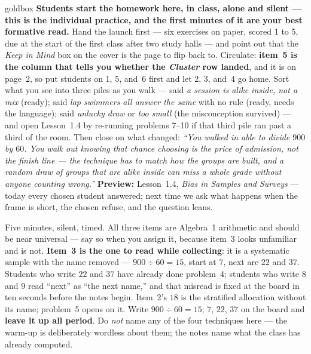 \documentclass[10pt]{article}
\begin{document}
\boxguard
\begin{skillbox}{goldbox}
\textbf{Students start the homework here, in class, alone and silent --- this is the individual
practice, and the first minutes of it are your best formative read.} Hand the launch first ---
six exercises on paper, scored 1 to 5, due at the start of the first class after two study
halls --- and point out that the \emph{Keep in Mind} box on the cover is the page to flip back
to. Circulate: \textbf{item~5 is the column that tells you whether the \emph{Cluster} row
landed}, and it is
on page~2, so put students on 1, 5, and~6 first and let 2, 3, and~4 go home. Sort what you see
into three piles as you walk --- said \emph{a session is alike inside, not a mix} (ready); said
\emph{lap swimmers all answer the same} with no rule (ready, needs the language); said
\emph{unlucky draw} or \emph{too small} (the misconception survived) --- and open Lesson~1.4 by
re-running problems 7--10 if that third pile ran past a third of the room. Then close
on what changed: \emph{``You walked in able to divide $900$ by $60$. You walk out knowing that
chance choosing is the price of admission, not the finish line --- the technique has to match
how the groups are built, and a random draw of groups that are alike inside can miss a whole
grade without anyone counting wrong.''} \textbf{Preview:} Lesson~1.4, \emph{Bias in Samples and
Surveys} --- today every chosen student answered; next time we ask what happens when the
frame is short, the chosen refuse, and the question leans.
\end{skillbox}

\begin{teachernote}[Warm-Up]
Five minutes, silent, timed. All three items are Algebra~1 arithmetic and should be near
universal --- say so when you assign it, because item~3 looks unfamiliar and is not.
\textbf{Item~3 is the one to read while collecting}: it is a systematic sample with the name
removed --- $900 \div 60 = 15$, start at $7$, next are $22$ and $37$. Students who write $22$
and $37$ have already done problem~4; students who write $8$ and $9$ read
``next'' as ``the next name,'' and that misread is fixed at the board in ten seconds before the
notes begin. Item~2's $18$ is the stratified allocation without its name; problem~5 opens on it.
Write $900 \div 60 = 15$; $7$, $22$, $37$ on the board and \textbf{leave it up all period}. Do
\emph{not} name any of the four techniques here --- the warm-up is deliberately wordless about
them; the notes name what the class has already computed.
\end{teachernote}
\end{document}
